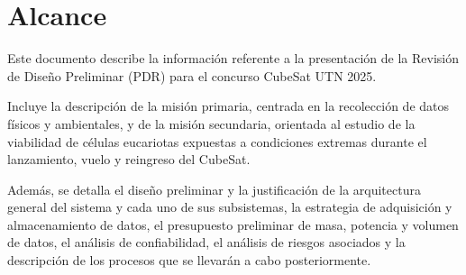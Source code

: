 \chapter{Alcance}
Este documento describe la información referente a la presentación de la Revisión de
Diseño Preliminar (PDR) para el concurso CubeSat UTN 2025.

Incluye la descripción de la misión primaria, centrada en la recolección de datos físicos
y ambientales, y de la misión secundaria, orientada al estudio de la viabilidad de células
eucariotas expuestas a condiciones extremas durante el lanzamiento, vuelo y reingreso del
CubeSat.

Además, se detalla el diseño preliminar y la justificación de la arquitectura general del
sistema y cada uno de sus subsistemas, la estrategia de adquisición y almacenamiento de
datos, el presupuesto preliminar de masa, potencia y volumen de datos, el análisis de confiabilidad,
el análisis de riesgos asociados y la descripción de los procesos que se llevarán a cabo posteriormente.

